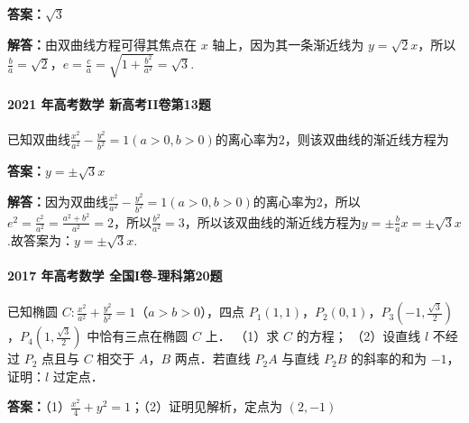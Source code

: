 \documentclass[UTF8,a4paper,11pt]{ctexart}
\begin{document}
\textbf{答案：}$\sqrt{3}$\par

\textbf{解答：}由双曲线方程可得其焦点在 $x$ 轴上，因为其一条渐近线为 $y=\sqrt{2}x$，所以 $\frac{b}{a}=\sqrt{2}$，$e=\frac{c}{a}=\sqrt{1+\frac{b^2}{a^2}}=\sqrt{3}$.

\paragraph{2021 年高考数学 新高考II卷第13题}

已知双曲线$\frac{x^2}{a^2}-\frac{y^2}{b^2}=1(a>0,b>0)$的离心率为$2$，则该双曲线的渐近线方程为\underline{\hspace{3cm}}

\textbf{答案：}$y=\pm\sqrt{3}x$\par

\textbf{解答：}因为双曲线$\frac{x^2}{a^2}-\frac{y^2}{b^2}=1(a>0,b>0)$的离心率为$2$，所以$e^2=\frac{c^2}{a^2}=\frac{a^2+b^2}{a^2}=2$，所以$\frac{b^2}{a^2}=3$，所以该双曲线的渐近线方程为$y=\pm\frac{b}{a}x=\pm\sqrt{3}x$.故答案为：$y=\pm\sqrt{3}x$.

\paragraph{2017 年高考数学 全国I卷-理科第20题}

已知椭圆 $C:\frac{x^2}{a^2}+\frac{y^2}{b^2}=1$（$a>b>0$），四点 $P_1(1,1)$，$P_2(0,1)$，$P_3(-1,\frac{\sqrt{3}}{2})$，$P_4(1,\frac{\sqrt{3}}{2})$ 中恰有三点在椭圆 $C$ 上．
（1）求 $C$ 的方程；
（2）设直线 $l$ 不经过 $P_2$ 点且与 $C$ 相交于 $A$，$B$ 两点．若直线 $P_2A$ 与直线 $P_2B$ 的斜率的和为 $-1$，证明：$l$ 过定点．

\textbf{答案：}（1）$\frac{x^2}{4}+y^2=1$；（2）证明见解析，定点为 $(2,-1)$\par
\end{document}
